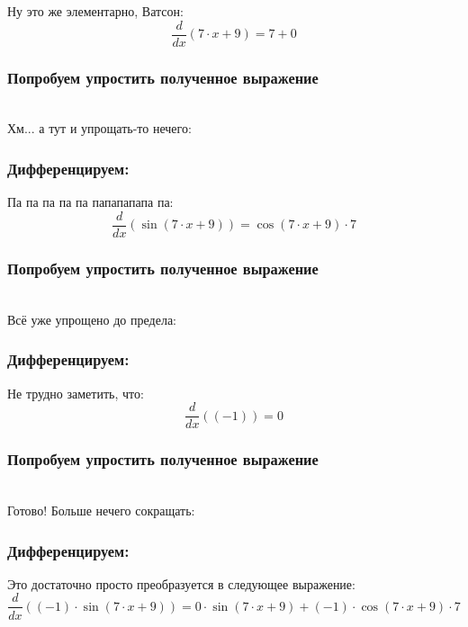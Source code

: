 \documentclass[a4paper,12pt]{article}
\begin{document}
Ну это же элементарно, Ватсон:
\begin{dmath}\frac{d}{dx}\left(7\cdot x+ 9\right)=7+ 0\end{dmath}
\subsubsection*{Попробуем упростить полученное выражение}
\\Хм... а тут и упрощать-то нечего:

\subsubsection*{Дифференцируем:}

Па па па па па папапапапа па:
\begin{dmath}\frac{d}{dx}\left(\operatorname{sin}\left(7\cdot x+ 9\right) \right)=\operatorname{cos}\left(7\cdot x+ 9\right) \cdot 7\end{dmath}
\subsubsection*{Попробуем упростить полученное выражение}
\\Всё уже упрощено до предела:

\subsubsection*{Дифференцируем:}

Не трудно заметить, что:
\begin{dmath}\frac{d}{dx}\left((-1)\right)=0\end{dmath}
\subsubsection*{Попробуем упростить полученное выражение}
\\Готово! Больше нечего сокращать:

\subsubsection*{Дифференцируем:}

Это достаточно просто преобразуется в следующее выражение:
\begin{dmath}\frac{d}{dx}\left((-1)\cdot \operatorname{sin}\left(7\cdot x+ 9\right) \right)=0\cdot \operatorname{sin}\left(7\cdot x+ 9\right) + (-1)\cdot \operatorname{cos}\left(7\cdot x+ 9\right) \cdot 7\end{dmath}
\end{document}
